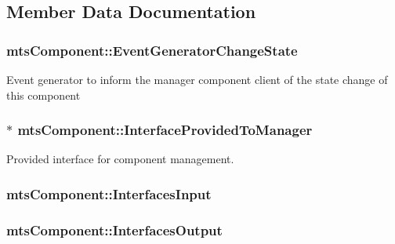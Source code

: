 \subsection{Member Data Documentation}
\hypertarget{classmts_component_ab7019fec5126701863a90ce46c9617f9}{
\subsubsection[{Event\-Generator\-Change\-State}]{ mts\-Component\-::\-Event\-Generator\-Change\-State\hspace{0.3cm}{\ttfamily [protected]}}}\label{classmts_component_ab7019fec5126701863a90ce46c9617f9}
Event generator to inform the manager component client of the state change of this component \hypertarget{classmts_component_a6f9323d126ef72b6c3803abe4864b759}{
\subsubsection[{Interface\-Provided\-To\-Manager}]{$\ast$ mts\-Component\-::\-Interface\-Provided\-To\-Manager\hspace{0.3cm}{\ttfamily [protected]}}}\label{classmts_component_a6f9323d126ef72b6c3803abe4864b759}
Provided interface for component management. \hypertarget{classmts_component_a64fd1c940ac3672259a942ecbaaf40be}{
\subsubsection[{Interfaces\-Input}]{ mts\-Component\-::\-Interfaces\-Input\hspace{0.3cm}{\ttfamily [protected]}}}\label{classmts_component_a64fd1c940ac3672259a942ecbaaf40be}
\hypertarget{classmts_component_a104e4fc2443e8f15304027701a9c1a8c}{
\subsubsection[{Interfaces\-Output}]{ mts\-Component\-::\-Interfaces\-Output\hspace{0.3cm}{\ttfamily [protected]}}}\label{classmts_component_a104e4fc2443e8f15304027701a9c1a8c}
